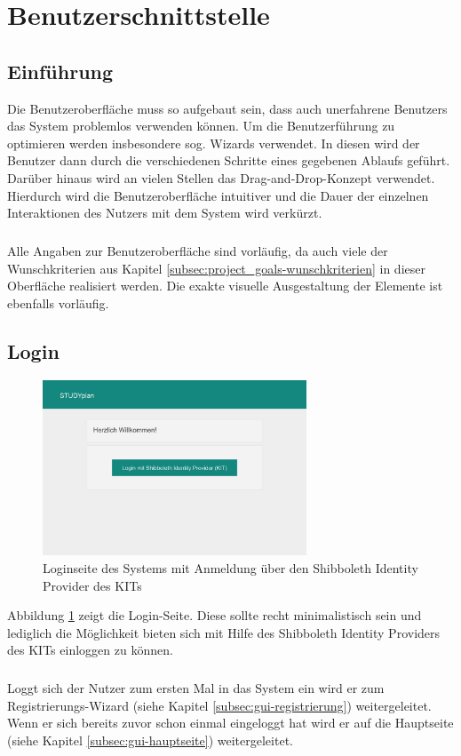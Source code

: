 \section{Benutzerschnittstelle}

\subsection{Einführung}
Die Benutzeroberfläche muss so aufgebaut sein, dass auch unerfahrene \glspl{Benutzer} das System problemlos verwenden können.
Um die Benutzerführung zu optimieren werden insbesondere sog. \glspl{Wizard} verwendet. In diesen wird der Benutzer dann durch die verschiedenen Schritte eines gegebenen Ablaufs geführt. Darüber hinaus wird an vielen Stellen das \gls{Drag-and-Drop}-Konzept verwendet.
Hierdurch wird die Benutzeroberfläche intuitiver und die Dauer der einzelnen Interaktionen des Nutzers mit dem System wird verkürzt.
\subparagraph{}
Alle Angaben zur Benutzeroberfläche sind vorläufig, da auch viele der Wunschkriterien aus Kapitel \ref{subsec:project_goals-wunschkriterien} in dieser Oberfläche realisiert werden. Die exakte visuelle Ausgestaltung der Elemente ist ebenfalls vorläufig.
\subsection{Login}
\begin{figure}[!htb]
	\caption{Loginseite des Systems mit Anmeldung über den \gls{Shibboleth Identity Provider} des \gls{KIT}s}
	\label{fig:gui-login-1}
	\centering
	\includegraphics[width=0.7\textwidth]{../GUI/ergebnisse/login-1.png}
\end{figure}
Abbildung \ref{fig:gui-login-1} zeigt die Login-Seite. Diese sollte recht minimalistisch sein und lediglich die Möglichkeit bieten sich mit Hilfe des \gls{Shibboleth Identity Provider}s des \gls{KIT}s einloggen zu können.
\subparagraph{}
Loggt sich der Nutzer zum ersten Mal in das System ein wird er zum Registrierungs-\gls{Wizard} (siehe Kapitel \ref{subsec:gui-registrierung}) weitergeleitet. Wenn er sich bereits zuvor schon einmal eingeloggt hat wird er auf die Hauptseite (siehe Kapitel \ref{subsec:gui-hauptseite}) weitergeleitet.
